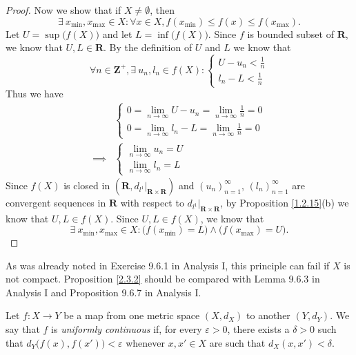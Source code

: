 \begin{proof}
    Now we show that if \(X \neq \emptyset\), then
    \[
        \exists\ x_{\min}, x_{\max} \in X : \forall x \in X, f(x_{\min}) \leq f(x) \leq f(x_{\max}).
    \]
    Let \(U = \sup\big(f(X)\big)\) and let \(L = \inf\big(f(X)\big)\).
    Since \(f\) is bounded subset of \(\mathbf{R}\), we know that \(U, L \in \mathbf{R}\).
    By the definition of \(U\) and \(L\) we know that
    \[
        \forall n \in \mathbf{Z}^+, \exists\ u_n, l_n \in f(X) : \begin{cases}
            U - u_n < \frac{1}{n} \\
            l_n - L < \frac{1}{n}
        \end{cases}
    \]
    Thus we have
    \begin{align*}
                 & \begin{cases}
                       0 = \lim_{n \to \infty} U - u_n = \lim_{n \to \infty} \frac{1}{n} = 0 \\
                       0 = \lim_{n \to \infty} l_n - L = \lim_{n \to \infty} \frac{1}{n} = 0
                   \end{cases} \\
        \implies & \begin{cases}
                       \lim_{n \to \infty} u_n = U \\
                       \lim_{n \to \infty} l_n = L
                   \end{cases}
    \end{align*}
    Since \(f(X)\) is closed in \((\mathbf{R}, d_{l^1}|_{\mathbf{R} \times \mathbf{R}})\) and \((u_n)_{n = 1}^\infty\), \((l_n)_{n = 1}^\infty\) are convergent sequences in \(\mathbf{R}\) with respect to \(d_{l^1}|_{\mathbf{R} \times \mathbf{R}}\), by Proposition \ref{1.2.15}(b) we know that \(U, L \in f(X)\).
    Since \(U, L \in f(X)\), we know that
    \[
        \exists\ x_{\min}, x_{\max} \in X : \big(f(x_{\min}) = L\big) \land \big(f(x_{\max}) = U\big).
    \]
\end{proof}

\begin{remark}\label{2.3.3}
    As was already noted in Exercise 9.6.1 in Analysis I, this principle can fail if \(X\) is not compact.
    Proposition \ref{2.3.2} should be compared with Lemma 9.6.3 in Analysis I and Proposition 9.6.7 in Analysis I.
\end{remark}

\begin{definition}\label{2.3.4}
    Let \(f : X \to Y\) be a map from one metric space \((X, d_X)\) to another \((Y, d_Y)\).
    We say that \(f\) is \emph{uniformly continuous} if, for every \(\varepsilon > 0\), there exists a \(\delta > 0\) such that \(d_Y\big(f(x), f(x')\big) < \varepsilon\) whenever \(x, x' \in X\) are such that \(d_X(x, x') < \delta\).
\end{definition}

